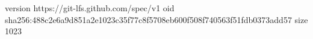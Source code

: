 version https://git-lfs.github.com/spec/v1
oid sha256:488c2e6a9d851a2e1023c35f77c8f5708eb600f508f740563f51fdb0373add57
size 1023
